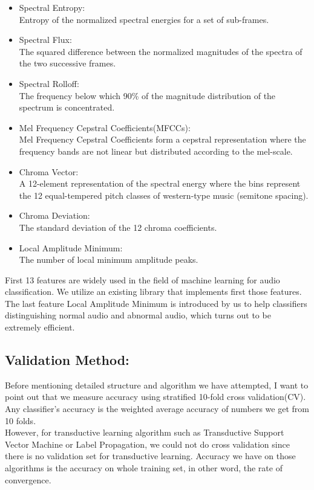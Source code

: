 \begin{itemize}
	\item Spectral Entropy:\\
	Entropy of the normalized spectral energies for a set of sub-frames.\cite{b3}\\
	\item Spectral Flux:\\
	The squared difference between the normalized magnitudes of the spectra of the two successive frames.\cite{b3}\\
	\item Spectral Rolloff:\\
	The frequency below which 90\% of the magnitude distribution of the spectrum is concentrated.\cite{b3}\\
	\item Mel Frequency Cepstral Coefficients(MFCCs):\\
	Mel Frequency Cepstral Coefficients form a cepstral representation where the frequency bands are not linear but distributed according to the mel-scale.\cite{b4}\\
	\item Chroma Vector:\\
	A 12-element representation of the spectral energy where the bins represent the 12 equal-tempered pitch classes of western-type music (semitone spacing).\cite{b5}\\
	\item Chroma Deviation:\\
	The standard deviation of the 12 chroma coefficients.\cite{b5}\\
	\item Local Amplitude Minimum:\\
	The number of local minimum amplitude peaks.\\
\end{itemize}
First 13 features are widely used in the field of machine learning for audio classification. We utilize an existing library\cite{b6} that implements first those features. The last feature Local Amplitude Minimum is introduced by us to help classifiers distinguishing normal audio and abnormal audio, which turns out to be extremely efficient. \\
\subsection{Validation Method:}
Before mentioning detailed structure and algorithm we have attempted, I want to point out that we measure accuracy using stratified 10-fold cross validation(CV). Any classifier's accuracy is the weighted average accuracy of numbers we get from 10 folds.  \\
\indent However, for transductive learning algorithm such as Transductive Support Vector Machine or Label Propagation, we could not do cross validation since there is no validation set for transductive learning. Accuracy we have on those algorithms is the accuracy on whole training set, in other word, the rate of convergence. 
